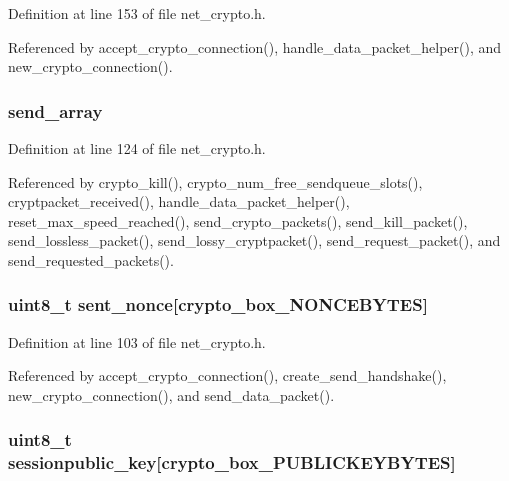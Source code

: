 Definition at line 153 of file net\+\_\+crypto.\+h.



Referenced by accept\+\_\+crypto\+\_\+connection(), handle\+\_\+data\+\_\+packet\+\_\+helper(), and new\+\_\+crypto\+\_\+connection().

\hypertarget{struct_crypto___connection_aa9112ee7e76eb3e870491f7c5c272197}{
\subsubsection[{send\+\_\+array}]{ send\+\_\+array}}\label{struct_crypto___connection_aa9112ee7e76eb3e870491f7c5c272197}


Definition at line 124 of file net\+\_\+crypto.\+h.



Referenced by crypto\+\_\+kill(), crypto\+\_\+num\+\_\+free\+\_\+sendqueue\+\_\+slots(), cryptpacket\+\_\+received(), handle\+\_\+data\+\_\+packet\+\_\+helper(), reset\+\_\+max\+\_\+speed\+\_\+reached(), send\+\_\+crypto\+\_\+packets(), send\+\_\+kill\+\_\+packet(), send\+\_\+lossless\+\_\+packet(), send\+\_\+lossy\+\_\+cryptpacket(), send\+\_\+request\+\_\+packet(), and send\+\_\+requested\+\_\+packets().

\hypertarget{struct_crypto___connection_a9df0e00e8f493ed6cd1ff45e7da33c0d}{
\subsubsection[{sent\+\_\+nonce}]{\setlength{\rightskip}{0pt plus 5cm}uint8\+\_\+t sent\+\_\+nonce\mbox{[}crypto\+\_\+box\+\_\+\+N\+O\+N\+C\+E\+B\+Y\+T\+E\+S\mbox{]}}}\label{struct_crypto___connection_a9df0e00e8f493ed6cd1ff45e7da33c0d}


Definition at line 103 of file net\+\_\+crypto.\+h.



Referenced by accept\+\_\+crypto\+\_\+connection(), create\+\_\+send\+\_\+handshake(), new\+\_\+crypto\+\_\+connection(), and send\+\_\+data\+\_\+packet().

\hypertarget{struct_crypto___connection_a6e74fbae398c7966800ee80f7b93dbfa}{
\subsubsection[{sessionpublic\+\_\+key}]{\setlength{\rightskip}{0pt plus 5cm}uint8\+\_\+t sessionpublic\+\_\+key\mbox{[}crypto\+\_\+box\+\_\+\+P\+U\+B\+L\+I\+C\+K\+E\+Y\+B\+Y\+T\+E\+S\mbox{]}}}\label{struct_crypto___connection_a6e74fbae398c7966800ee80f7b93dbfa}


